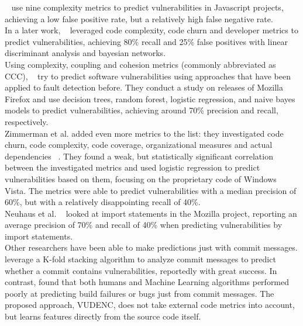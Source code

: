 \documentclass[
	a4paper,
	pagesize,
	pdftex,
	12pt,
	twoside, %
	BCOR=5mm, %
	ngerman,
	fleqn,
	final,
	]{scrartcl}
\begin{document}
~\cite{Shin.2008} use nine complexity metrics to predict vulnerabilities in Javascript projects, achieving a low false positive rate, but a relatively high false negative rate.\\
In a later work, ~\cite{Shin.2010} leveraged code complexity, code churn and developer metrics to predict vulnerabilities, achieving 80\% recall and 25\% false positives with linear discriminant analysis and bayesian networks. \\
Using complexity, coupling and cohesion metrics (commonly abbreviated as CCC), ~\cite{Chowdhury.2011} try to predict software vulnerabilities using approaches that have been applied to fault detection before. They conduct a study on releases of Mozilla Firefox and use decision trees, random forest, logistic regression, and naive bayes models to predict vulnerabilities, achieving around 70\% precision and recall, respectively. \\
Zimmerman et al. added even more metrics to the list: they investigated code churn, code complexity, code coverage, organizational measures and actual dependencies ~\cite{Zimmermann.2010}. They found a weak, but statistically significant correlation between the investigated metrics and used logistic regression to predict vulnerabilities based on them, focusing on the proprietary code of Windows Vista. The metrics were able to predict vulnerabilities with a median precision of 60\%, but with a relatively disappointing recall of 40\%. \\
Neuhaus et al. ~\cite{Neuhaus.2007} looked at import statements in the Mozilla project, reporting an average precision of 70\% and recall of 40\% when predicting vulnerabilities by import statements. \\
Other researchers have been able to make predictions just with commit messages. \cite{Zhou.2017} leverage a K-fold stacking algorithm to analyze commit messages to predict whether a commit contains vulnerabilities, reportedly with great success. In contrast, \cite{Russell.2018} found that both humans and Machine Learning algorithms performed poorly at predicting build failures or bugs just from commit messages.
The proposed approach, VUDENC, does not take external code metrics into account, but learns features directly from the source code itself. 
\end{document}
